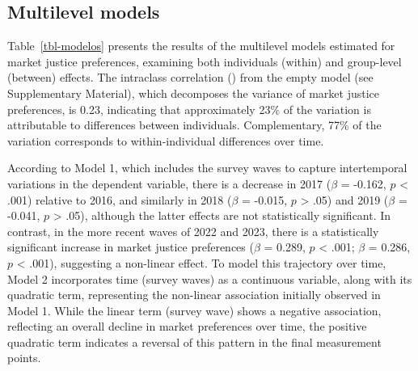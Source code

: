 \documentclass[
  12pt,
]{article}
\begin{document}
\subsection{Multilevel models}\label{multilevel-models}

Table~\ref{tbl-modelos} presents the results of the multilevel models
estimated for market justice preferences, examining both individuals
(within) and group-level (between) effects. The intraclass correlation
()
from the empty model (see Supplementary Material), which decomposes the
variance of market justice preferences, is 0.23, indicating that
approximately 23\% of the variation is attributable to differences
between individuals. Complementary, 77\% of the variation corresponds to
within-individual differences over time.

According to Model 1, which includes the survey waves to capture
intertemporal variations in the dependent variable, there is a decrease
in 2017 (\(\beta\) = -0.162, \(p\) \textless{} .001) relative to 2016,
and similarly in 2018 (\(\beta\) = -0.015, \(p\) \textgreater{} .05) and
2019 (\(\beta\) = -0.041, \(p\) \textgreater{} .05), although the latter
effects are not statistically significant. In contrast, in the more
recent waves of 2022 and 2023, there is a statistically significant
increase in market justice preferences (\(\beta\) = 0.289, \(p\)
\textless{} .001; \(\beta\) = 0.286, \(p\) \textless{} .001), suggesting
a non-linear effect. To model this trajectory over time, Model 2
incorporates time (survey waves) as a continuous variable, along with
its quadratic term, representing the non-linear association initially
observed in Model 1. While the linear term (survey wave) shows a
negative association, reflecting an overall decline in market
preferences over time, the positive quadratic term indicates a reversal
of this pattern in the final measurement points.
\end{document}
